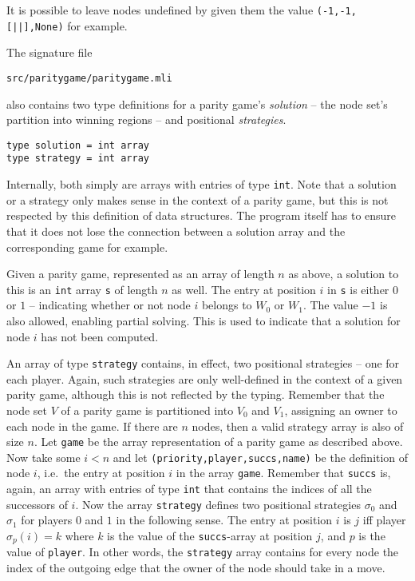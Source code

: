 It is possible to leave nodes undefined by given them the value \verb#(-1,-1,[||],None)# for example. 

The signature file
\begin{verbatim}
src/paritygame/paritygame.mli
\end{verbatim}
also contains two type definitions for a parity game's \emph{solution} -- the node set's partition into
winning regions -- and positional \emph{strategies}.
\begin{verbatim}
type solution = int array
type strategy = int array
\end{verbatim}
Internally, both simply are arrays with entries of type \texttt{int}. Note that a solution or a strategy
only makes sense in the context of a parity game, but this is not respected by this definition of data
structures. The program itself has to ensure that it does not lose the connection between a solution array
and the corresponding game for example.

Given a parity game, represented as an array of length $n$ as above, a solution to this is an \texttt{int}
array \texttt{s} of length $n$ as well. The entry at position $i$ in \texttt{s} is either $0$ or $1$ --
indicating whether or not node $i$ belongs to $W_0$ or $W_1$. The value $-1$ is also allowed, enabling partial
solving. This is used to indicate that a solution for node $i$ has not been computed.

An array of type \texttt{strategy} contains, in effect, two positional strategies -- one for each player.
Again, such strategies are only well-defined in the context of a given parity game, although this is
not reflected by the typing. Remember that the node set $V$ of a parity game is partitioned into
$V_0$ and $V_1$, assigning an owner to each node in the game. If there are $n$ nodes, then a valid
strategy array is also of size $n$. Let \texttt{game} be the array representation of a parity game as
described above. Now take some $i < n$ and let \texttt{(priority,player,succs,name)} be the definition of
node $i$, i.e.\ the entry at position $i$ in the array \texttt{game}. Remember that \texttt{succs} is, again,
an array with entries of type \texttt{int} that contains the indices of all the successors of $i$. Now
the array \texttt{strategy} defines two positional strategies $\sigma_0$ and $\sigma_1$ for players
$0$ and $1$ in the following sense. The entry at position $i$ is $j$ iff player $\sigma_p(i) = k$ where
$k$ is the value of the \texttt{succs}-array at position $j$, and $p$ is the value of \texttt{player}.
In other words, the \texttt{strategy} array contains for every node the index of the outgoing edge that
the owner of the node should take in a move.

